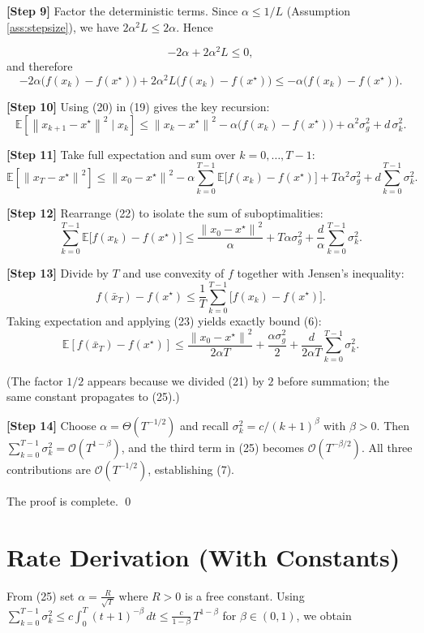 \documentclass[11pt]{article}
\newcommand{\E}{\mathbb{E}}
\newcommand{\norm}[1]{\left\|#1\right\|}
\begin{document}
\noindent\textbf{[Step 9] }Factor the deterministic terms.  Since $\alpha\le 1/L$ (Assumption \ref{ass:stepsize}), we have $2\alpha^{2}L\le 2\alpha$. Hence  

\[
-2\alpha +2\alpha^{2}L \le 0,
\]
and therefore
\[
-2\alpha\big(f(x_{k})-f(x^{\star})\big)
+2\alpha^{2}L\big(f(x_{k})-f(x^{\star})\big)
\le -\alpha\big(f(x_{k})-f(x^{\star})\big).
\tag{20}
\]

\noindent\textbf{[Step 10] }Using (20) in (19) gives the key recursion:
\[
\E\!\left[\norm{x_{k+1}-x^{\star}}^{2}\mid x_{k}\right]
\le \norm{x_{k}-x^{\star}}^{2}
-\alpha\big(f(x_{k})-f(x^{\star})\big)
+\alpha^{2}\sigma_{g}^{2}
+d\,\sigma_{k}^{2}.
\tag{21}
\]

\noindent\textbf{[Step 11] }Take full expectation and sum over $k=0,\dots,T-1$:
\[
\E\!\left[\norm{x_{T}-x^{\star}}^{2}\right]
\le \norm{x_{0}-x^{\star}}^{2}
-\alpha\sum_{k=0}^{T-1}\E\!\big[f(x_{k})-f(x^{\star})\big]
+T\alpha^{2}\sigma_{g}^{2}
+d\sum_{k=0}^{T-1}\sigma_{k}^{2}.
\tag{22}
\]

\noindent\textbf{[Step 12] }Rearrange (22) to isolate the sum of suboptimalities:
\[
\sum_{k=0}^{T-1}\E\!\big[f(x_{k})-f(x^{\star})\big]
\le \frac{\norm{x_{0}-x^{\star}}^{2}}{\alpha}
+T\alpha\sigma_{g}^{2}
+\frac{d}{\alpha}\sum_{k=0}^{T-1}\sigma_{k}^{2}.
\tag{23}
\]

\noindent\textbf{[Step 13] }Divide by $T$ and use convexity of $f$ together with Jensen’s inequality:
\[
f(\bar x_{T})-f(x^{\star})
\le \frac{1}{T}\sum_{k=0}^{T-1}\big[f(x_{k})-f(x^{\star})\big].
\tag{24}
\]
Taking expectation and applying (23) yields exactly bound (6):
\[
\E\!\left[f(\bar x_{T})-f(x^{\star})\right]
\le \frac{\norm{x_{0}-x^{\star}}^{2}}{2\alpha T}
+\frac{\alpha\sigma_{g}^{2}}{2}
+\frac{d}{2\alpha T}\sum_{k=0}^{T-1}\sigma_{k}^{2}.
\tag{25}
\]

(The factor $1/2$ appears because we divided (21) by $2$ before summation; the same constant propagates to (25).)

\noindent\textbf{[Step 14] }Choose $\alpha = \Theta(T^{-1/2})$ and recall $\sigma_{k}^{2}=c/(k+1)^{\beta}$ with $\beta>0$.  
Then $\sum_{k=0}^{T-1}\sigma_{k}^{2}= \mathcal O(T^{1-\beta})$, and the third term in (25) becomes $\mathcal O(T^{-\beta/2})$.  
All three contributions are $\mathcal O(T^{-1/2})$, establishing (7).

\bigskip
The proof is complete. \qed

\section*{Rate Derivation (With Constants)}
From (25) set $\alpha = \frac{R}{\sqrt{T}}$ where $R>0$ is a free constant.
Using $\sum_{k=0}^{T-1}\sigma_{k}^{2}\le c\int_{0}^{T} (t+1)^{-\beta}\,dt
\le \frac{c}{1-\beta}\,T^{1-\beta}$ for $\beta\in(0,1)$, we obtain  
\end{document}
